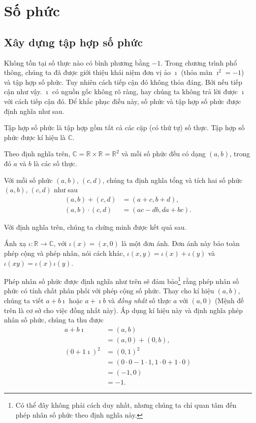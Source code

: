 \section{Số phức}

\subsection{Xây dựng tập hợp số phức}

Không tồn tại số thực nào có bình phương bằng $-1$. Trong chương trình phổ thông, chúng ta đã được giới thiệu khái niệm đơn vị ảo $\imath$ (thỏa mãn $\imath^{2} = -1$) và tập hợp số phức. Tuy nhiên cách tiếp cận đó không thỏa đáng. Bởi nếu tiếp cận như vậy. $\imath$ có nguồn gốc không rõ ràng, hay chúng ta không trả lời được $\imath$ với cách tiếp cận đó. Để khắc phục điều này, số phức và tập hợp số phức được định nghĩa như sau.
\begin{definition}
	Tập hợp số phức là tập hợp gồm tất cả các cặp (có thứ tự) số thực. Tập hợp số phức được kí hiệu là $\mathbb{C}$.
\end{definition}

Theo định nghĩa trên, $\mathbb{C} = \mathbb{R}\times\mathbb{R} = \mathbb{R}^{2}$ và mỗi số phức đều có dạng $(a, b)$, trong đó $a$ và $b$ là các số thực.

\begin{definition}
	Với mỗi số phức $(a, b)$, $(c, d)$, chúng ta định nghĩa tổng và tích hai số phức $(a, b)$, $(c, d)$ như sau
	\begin{align*}
		(a, b) + (c, d)    & = (a + c, b + d),     \\
		(a, b)\cdot (c, d) & = (ac - db, da + bc).
	\end{align*}
\end{definition}

Với định nghĩa trên, chúng ta chứng minh được kết quả sau.
\begin{proposition}
	Ánh xạ $\iota: \mathbb{R}\to \mathbb{C}$, với $\iota(x) = (x, 0)$ là một đơn ánh. Đơn ánh này bảo toàn phép cộng và phép nhân, nói cách khác, $\iota(x, y) = \iota(x) + \iota(y)$ và $\iota(xy) = \iota(x)\iota(y)$.
\end{proposition}

Phép nhân số phức được định nghĩa như trên sẽ đảm bảo\footnote{Có thể đây không phải cách duy nhất, nhưng chúng ta chỉ quan tâm đến phép nhân số phức theo định nghĩa này.} rằng phép nhân số phức có tính chất phân phối với phép cộng số phức. Thay cho kí hiệu $(a, b)$, chúng ta viết $a + b\imath$ hoặc $a + \imath b$ và \textit{đồng nhất} số thực $a$ với $(a, 0)$ (Mệnh đề trên là cơ sở cho việc đồng nhất này). Áp dụng kí hiệu này và định nghĩa phép nhân số phức, chúng ta thu được
\[
	\begin{split}
		a + b\imath & = (a, b) \\
		& = (a, 0) + (0, b), \\
		{(0 + 1\imath)}^{2} & = {(0, 1)}^{2} \\
		& = (0\cdot 0 - 1\cdot 1, 1\cdot 0 + 1\cdot 0) \\
		& = (-1, 0) \\
		& = -1.
	\end{split}
\]

